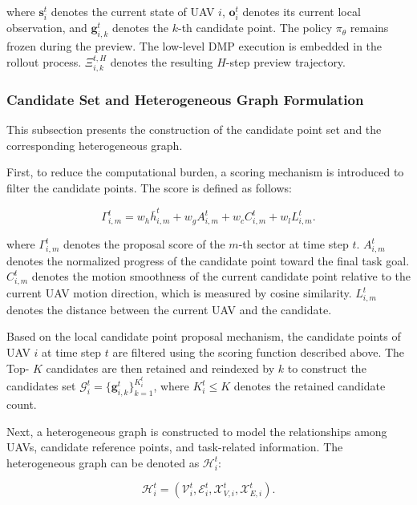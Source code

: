 \noindent
where $\mathbf{s}_i^t$ denotes the current state of UAV $i$, $\mathbf{o}_i^t$ denotes its current local observation, and $\mathbf{g}_{i,k}^t$ denotes the $k$-th candidate point. The policy $\pi_{\theta}$ remains frozen during the preview. The low-level DMP execution is embedded in the rollout process. $\Xi_{i,k}^{t,H}$ denotes the resulting $H$-step preview trajectory.

\subsubsection{Candidate Set and Heterogeneous Graph Formulation}

This subsection presents the construction of the candidate point set and the corresponding heterogeneous graph.

First, to reduce the computational burden, a scoring mechanism is introduced to filter the candidate points. The score is defined as follows:

\begin{equation}
    \label{eq:sector_proposal_score}
    \Gamma_{i,m}^t =
    w_h \bar{h}_{i,m}^t
    + w_g A_{i,m}^t
    + w_c C_{i,m}^t
    + w_l L_{i,m}^t .
\end{equation}

\noindent
where $\Gamma_{i,m}^t$ denotes the proposal score of the $m$-th sector at time step $t$. $A_{i,m}^t$ denotes the normalized progress of the candidate point toward the final task goal. $C_{i,m}^t$ denotes the motion smoothness of the current candidate point relative to the current UAV motion direction, which is measured by cosine similarity. $L_{i,m}^t$ denotes the distance between the current UAV and the candidate.

Based on the local candidate point proposal mechanism, the candidate points of UAV $i$ at time step $t$ are filtered using the scoring function described above. The Top- $K$ candidates are then retained and reindexed by $k$ to construct the candidates set $\mathcal{G}_i^t = \{\mathbf{g}_{i,k}^t\}_{k=1}^{K_i^t}$, where $K_i^t\leq K$ denotes the retained candidate count. 

Next, a heterogeneous graph is constructed to model the relationships among UAVs, candidate reference points, and task-related information. The heterogeneous graph can be denoted as $\mathcal{H}_{i}^{t}$:


\begin{equation}
    \label{eq:dynamic_graph}
    \mathcal{H}_{i}^{t}
    =
    \left(
    \mathcal{V}_{i}^{t},
    \mathcal{E}_{i}^{t},
    \mathcal{X}_{V,i}^{t},
    \mathcal{X}_{E,i}^{t}
    \right).
\end{equation}

